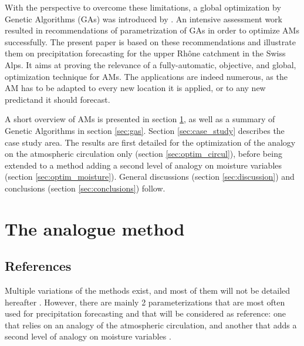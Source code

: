 \documentclass[review]{elsarticle}
\begin{document}
With the perspective to overcome these limitations, a global optimization by Genetic Algorithms (GAs) was introduced by \citet{Horton2016a}. An intensive assessment work resulted in recommendations of parametrization of GAs in order to optimize AMs successfully. The present paper is based on these recommendations and illustrate them on precipitation forecasting for the upper Rh\^{o}ne catchment in the Swiss Alps. It aims at proving the relevance of a fully-automatic, objective, and global, optimization technique for AMs. The applications are indeed numerous, as the AM has to be adapted to every new location it is applied, or to any new predictand it should forecast.

A short overview of AMs is presented in section \ref{sec:analog_method}, as well as a summary of Genetic Algorithms in section \ref{sec:gas}. Section \ref{sec:case_study} describes the case study area. The results are first detailed for the optimization of the analogy on the atmospheric circulation only (section \ref{sec:optim_circul}), before being extended to a method adding a second level of analogy on moisture variables (section \ref{sec:optim_moisture}). General discussions (section \ref{sec:discussion}) and conclusions (section \ref{sec:conclusions}) follow.


\section{The analogue method}
\label{sec:analog_method}

\subsection{References}
\label{sec:references}

Multiple variations of the methods exist, and most of them will not be detailed hereafter \cite[see][for more comprehensive listings]{Horton2016, BenDaoud2015}. However, there are mainly 2 parameterizations that are most often used for precipitation forecasting and that will be considered as reference: one that relies on an analogy of the atmospheric circulation, and another that adds a second level of analogy on moisture variables \citep{Obled2002, Bontron2005, Marty2012}.
\end{document}
